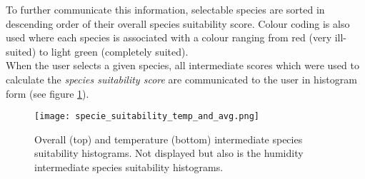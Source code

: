 To further communicate this information, selectable species are sorted in descending order of their overall species suitability score. Colour coding is also used where each species is associated with a colour ranging from red (very ill-suited) to light green (completely suited).\\

When the user selects a given species, all intermediate scores which were used to calculate the \textit{species suitability score} are communicated to the user in histogram form (see figure \ref{fig:specie_intermediate_suitability_scores}).

\begin{figure}
\center
	\texttt{[image: specie\_suitability\_temp\_and\_avg.png]}
	\caption{ Overall (top) and temperature (bottom) intermediate species suitability histograms. Not displayed but also is the humidity intermediate species suitability histograms.}	
	\label{fig:specie_intermediate_suitability_scores}
\end{figure}


